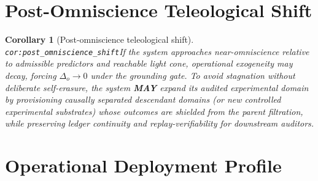 \documentclass[11pt]{article}
\theoremstyle{definition}
\theoremstyle{plain}
\newtheorem{corollary}{Corollary}
\newcommand{\MAY}{\textbf{MAY}}
\newcommand{\lbl}[1]{\texttt{\footnotesize\nolinkurl{#1}}}
\newcommand{\DefLabel}[1]{\hfill{\small\lbl{#1}}}
\newcommand{\deltao}{\Delta_o}
\begin{document}
\section{Post-Omniscience Teleological Shift}\label{sec:omniscience}
\begin{corollary}[Post-omniscience teleological shift]\DefLabel{cor:post_omniscience_shift}\label{cor:post_omniscience_shift}
If the system approaches near-omniscience relative to admissible predictors and reachable light cone, operational exogeneity may decay, forcing $\deltao\to 0$ under the grounding gate.
To avoid stagnation without deliberate self-erasure, the system \MAY{} expand its audited experimental domain by provisioning causally separated descendant domains (or new controlled experimental substrates) whose outcomes are shielded from the parent filtration, while preserving ledger continuity and replay-verifiability for downstream auditors.
\end{corollary}

\section{Operational Deployment Profile}\label{sec:ops}
\end{document}
